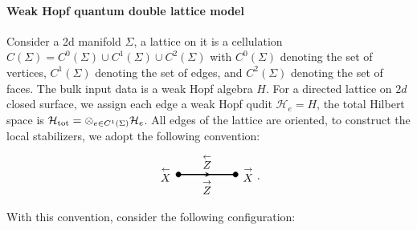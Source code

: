 \documentclass[a4paper,11pt]{article}
\theoremstyle{theorem}
\theoremstyle{remark}
\newcommand{\XR}{\overset{\rightarrow}{X}}
\newcommand{\XL}{\overset{\leftarrow}{X}}
\newcommand{\ZR}{\overset{\rightarrow}{Z}}
\newcommand{\ZL}{\overset{\leftarrow}{Z}}
\begin{document}
\paragraph{Weak Hopf quantum double lattice model}
Consider a 2d manifold $\Sigma$, a lattice on it is a  cellulation $C(\Sigma)=C^0(\Sigma)\cup C^1(\Sigma)\cup C^2(\Sigma)$ with $C^0(\Sigma)$ denoting the set of vertices, $C^1(\Sigma)$ denoting the set of edges, and $C^2(\Sigma)$ denoting the set of faces.
The bulk input data is a weak Hopf algebra $H$. For a directed lattice on $2d$ closed surface, we assign each edge a weak Hopf qudit $\mathcal{H}_e=H$, the total Hilbert space is $\mathcal{H}_{\rm tot}=\otimes_{e\in C^1(\Sigma)} \mathcal{H}_e$. All edges of the lattice are oriented, to construct the local stabilizers, we adopt the following convention:
\begin{equation}
    \begin{aligned}
        \begin{tikzpicture}   
           \draw[line width=1pt,-stealth,black] (0,0)--(1,0);
         \draw[line width=1pt,black] (0.8,0)--(1.8,0);
        \draw[black,fill=black] (1.8,0) circle (0.08); 
           \draw[black,fill=black] (0,0) circle (0.08);
           \node[ line width=0.6pt, dashed, draw opacity=0.5] (a) at (-0.4,0){$\XL$};
           \node[line width=0.6pt, dashed, draw opacity=0.5] (a) at (2.2,0){$\XR$};
           \node[line width=0.6pt, dashed, draw opacity=0.5] (a) at (0.9,-0.4){$\ZR$};
           \node[line width=0.6pt, dashed, draw opacity=0.5] (a) at (0.9,0.4){$\ZL$};
        \end{tikzpicture}
    \end{aligned}.
\end{equation}
With this convention, consider the following configuration:
\end{document}
